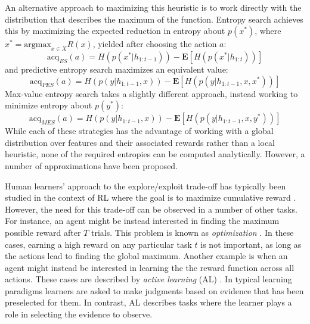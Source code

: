 \documentclass[10pt,letterpaper]{article}
\begin{document}
	An alternative approach to maximizing this heuristic is to work directly with the distribution that describes the maximum of the function. Entropy search \citep{Hennig} achieves this by maximizing the expected reduction in entropy about $p(x^{*})$, where $x^{*} = \text{argmax}_{x \in X} R(x)$, yielded after choosing the action $a$:
	\begin{equation}
	\text{acq}_{ES}(a) = H(p(x^{*}|h_{1:t-1})) - \mathbf{E}[H(p(x^{*}|h_{1:t}))]
	\end{equation}
	and predictive entropy search \citep{Henrandez-Lobato} maximizes an equivalent value: 
	\begin{equation}
	\text{acq}_{PES}(a) = H(p(y|h_{1:t-1}, x)) - \mathbf{E}[H(p(y|h_{1:t-1}, x, x^{*}))]
	\end{equation}
	Max-value entropy search \cite{Wang} takes a slightly different approach, instead working to minimize entropy about $p(y^{*})$:
	\begin{equation}
	\text{acq}_{MES}(a) = H(p(y|h_{1:t-1}, x)) - \mathbf{E}[H(p(y|h_{1:t-1}, x, y^{*}))]
	\end{equation}
	While each of these strategies has the advantage of working with a global distribution over features and their associated rewards rather than a local heuristic, none of the required entropies can be computed analytically. However, a number of approximations have been proposed.
	
	Human learners' approach to the explore/exploit trade-off has typically been studied in the context of RL where the goal is to maximize cumulative reward \citep[e.g.][]{Bechara2005, SteyversLeeWagenmakers2009a, SchulzEmmanouilSpeekenbrink2017a}. However, the need for this trade-off can be observed in a number of other tasks. For instance, an agent might be instead interested in finding the maximum possible reward after $T$ trials. This problem is known as \textit{optimization} \citep[e.g.][]{}. In these cases, earning a high reward on any particular task $t$ is not important, as long as the actions lead to finding the global maximum. Another example is when an agent might instead be interested in learning the the reward function across all actions. These cases are described by \textit{active learning} (AL) \citep[e.g.][]{Bramley, BramleyGerstenbergTenenbaum2016a}. In typical learning paradigms learners are asked to make judgments based on evidence that has been preselected for them. In contrast, AL describes tasks where the learner plays a role in selecting the evidence to observe.
	
\end{document}
